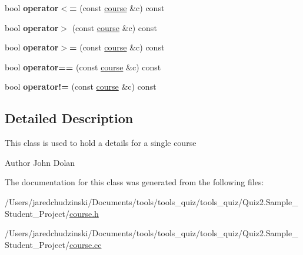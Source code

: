 \begin{DoxyCompactItemize}
bool {\bfseries operator$<$=} (const \mbox{\hyperlink{classcourse}{course}} \&c) const
\item 
\mbox{\label{classcourse_a16df685718a7ca9e98408b65109897b6}} 
bool {\bfseries operator$>$} (const \mbox{\hyperlink{classcourse}{course}} \&c) const
\item 
\mbox{\label{classcourse_ad15d2508cfb6d22103aaec608bcfdc74}} 
bool {\bfseries operator$>$=} (const \mbox{\hyperlink{classcourse}{course}} \&c) const
\item 
\mbox{\label{classcourse_aafce75fc85cdb94a5a08eaaba359da16}} 
bool {\bfseries operator==} (const \mbox{\hyperlink{classcourse}{course}} \&c) const
\item 
\mbox{\label{classcourse_ae01c5e2445600d485da28e0ba7c48b3a}} 
bool {\bfseries operator!=} (const \mbox{\hyperlink{classcourse}{course}} \&c) const
\end{DoxyCompactItemize}


\subsection{Detailed Description}
This class is used to hold a details for a single course \begin{DoxyAuthor}{Author}
John Dolan 
\end{DoxyAuthor}


The documentation for this class was generated from the following files\+:\begin{DoxyCompactItemize}
\item 
/\+Users/jaredchudzinski/\+Documents/tools/tools\+\_\+quiz/tools\+\_\+quiz/\+Quiz2.\+Sample\+\_\+\+Student\+\_\+\+Project/\mbox{\hyperlink{course_8h}{course.\+h}}\item 
/\+Users/jaredchudzinski/\+Documents/tools/tools\+\_\+quiz/tools\+\_\+quiz/\+Quiz2.\+Sample\+\_\+\+Student\+\_\+\+Project/\mbox{\hyperlink{course_8cc}{course.\+cc}}\end{DoxyCompactItemize}

